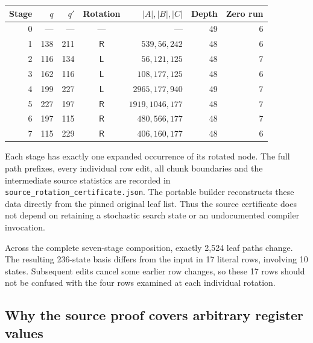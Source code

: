 \begin{center}
\begin{tabular}{rrrc rrr}
\toprule
Stage & $q$ & $q'$ & Rotation & $|A|,|B|,|C|$ & Depth & Zero run\\
\midrule
0 & --- & --- & --- & --- & 49 & 6\\
1 & 138 & 211 & $\mathsf R$ & $539,56,242$ & 48 & 6\\
2 & 116 & 134 & $\mathsf L$ & $56,121,125$ & 48 & 7\\
3 & 162 & 116 & $\mathsf L$ & $108,177,125$ & 48 & 6\\
4 & 199 & 227 & $\mathsf L$ & $2965,177,940$ & 49 & 7\\
5 & 227 & 197 & $\mathsf R$ & $1919,1046,177$ & 48 & 7\\
6 & 197 & 115 & $\mathsf R$ & $480,566,177$ & 48 & 7\\
7 & 115 & 229 & $\mathsf R$ & $406,160,177$ & 48 & 6\\
\bottomrule
\end{tabular}
\end{center}

Each stage has exactly one expanded occurrence of its rotated node.
The full path prefixes, every individual row edit, all chunk boundaries
and the intermediate source statistics are recorded in
\texttt{source\_rotation\_certificate.json}.  The portable builder
reconstructs these data directly from the pinned original leaf list.
Thus the source certificate does not depend on retaining a stochastic
search state or an undocumented compiler invocation.

Across the complete seven-stage composition, exactly 2,524 leaf paths
change.  The resulting 236-state basis differs from the input in 17
literal rows, involving 10 states.  Subsequent edits cancel some earlier
row changes, so these 17 rows should not be confused with the four rows
examined at each individual rotation.

\subsection{Why the source proof covers arbitrary register values}

